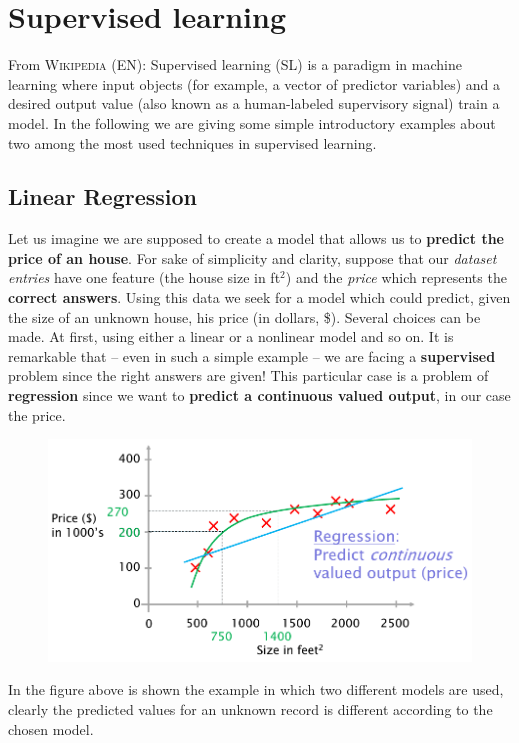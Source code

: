 \section{Supervised learning}
From \textsc{Wikipedia (EN)}: \textsf{Supervised learning (SL) is a paradigm in machine learning where input objects (for example, a vector of predictor variables) and a desired output value (also known as a human-labeled supervisory signal) train a model.} In the following we are giving some simple introductory examples about two among the most used techniques in supervised learning.
\subsection{Linear Regression}
Let us imagine we are supposed to create a model that allows us to \textbf{predict the price of an house}. For sake of simplicity and clarity, suppose that our \textit{dataset entries} have one feature (the house size in ft$^2$) and the \textit{price} which represents the \textbf{correct answers}.
Using this data we seek for a model which could predict, given the size of an unknown house, his price (in dollars, \$). Several choices can be made. At first, using either a linear or a nonlinear model and so on. It is remarkable that -- even in such a simple example -- we are facing a \textbf{supervised} problem since the right answers are given! This particular case is a problem of \textbf{regression} since we want to \textbf{predict a continuous valued output}, in our case the price.

\begin{figure}[h]
    \centering
    \includegraphics[scale=0.5]{img/prices.png}
\end{figure}

In the figure above is shown the example in which two different models are used, clearly the predicted values for an unknown record is different according to the chosen model.

